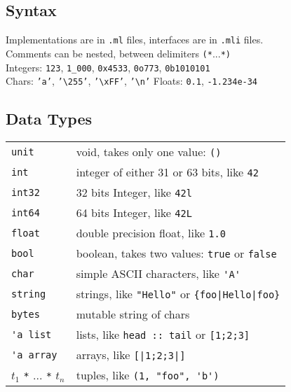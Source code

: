 \documentclass[10pt,landscape]{article}
\begin{document}
\setlength{\premulticols}{1pt}
\setlength{\postmulticols}{1pt}
\setlength{\multicolsep}{1pt}
\setlength{\columnsep}{2em}


\begin{multicols}{3}

\subsection{Syntax}

Implementations are in \verb!.ml! files, interfaces are in \verb!.mli!
files.\\
 Comments can be nested, between delimiters \verb!(*!...\verb!*)!\\
Integers: \verb!123!, \verb!1_000!, \verb!0x4533!, \verb!0o773!, \verb!0b1010101!\\
Chars: \texttt{'a'}, \texttt{'\textbackslash{}255'}, \texttt{'\textbackslash{}xFF'}, \texttt{'\textbackslash{}n'}
\hfill
Floats: \verb!0.1!, \verb!-1.234e-34!\\
\subsection{Data Types}

\begin{tabular}{ll}
\verb!unit! & void, takes only one value: \verb!()!\\
\verb!int! & integer of either 31 or 63 bits, like \verb!42! \\
\verb!int32! & 32 bits Integer, like \verb!42l! \\
\verb!int64! & 64 bits Integer, like \verb!42L! \\
\verb!float! & double precision float, like \verb!1.0! \\
\verb!bool! & boolean, takes two values: \verb!true! or \verb!false!\\
\verb!char! & simple ASCII characters, like \verb!'A'!\\
\verb!string! & strings, like \verb!"Hello"! or \verb!{foo|Hello|foo}!\\
\verb!bytes! & mutable string of chars \\
\verb!'a list! & lists, like \verb!head :: tail! or \verb![1;2;3]!   \\
\verb!'a array! & arrays, like \verb![|1;2;3|]! \\
$t_1$ \verb!*! ... \verb!*! $t_n$& tuples, like \verb!(1, "foo", 'b')!
\end{tabular}


\end{multicols}
\end{document}
